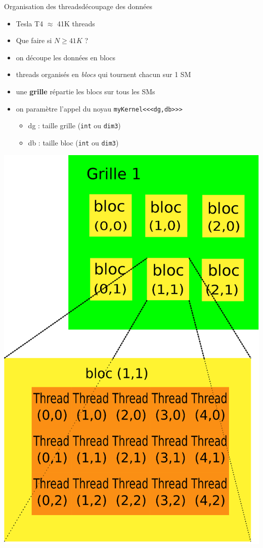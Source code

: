 \documentclass[11pt,mathserif]{beamer}
\newcommand{\scout}{\faAngellist}
\newcommand{\galde}{\faQuestion}
\newcommand{\argi}{\faLightbulbO}
\begin{document}
\begin{frame}{Organisation des threads}{découpage des données}
 \pause
 \begin{minipage}[c]{0.59\linewidth}
  \begin{itemize}[<+->]
    \item[\argi] Tesla T4 $\approx$ 41K threads 
    \item[\galde] Que faire si $N \geq 41K$ ?
    \item[\scout] on découpe les données en blocs
    \item[\argi] threads organisés en {\em blocs} qui tournent chacun sur 1 SM
    \item[\argi] une {\bf grille} répartie les blocs sur tous les SMs
    \item[\argi] on paramètre l'appel du noyau \texttt{myKernel<<<dg,db>>>} 
      \begin{itemize}
        \item dg : taille grille (\texttt{int} ou \texttt{dim3})
        \item db : taille bloc (\texttt{int} ou \texttt{dim3})
      \end{itemize}
  \end{itemize}
\end{minipage}
\begin{minipage}[c]{0.39\linewidth}
\begin{center}
  \colorbox{white}{\includegraphics[width=0.8\linewidth]{fig/grille_et_blocs.eps}}
\end{center}
\end{minipage}
\end{frame}
\end{document}

